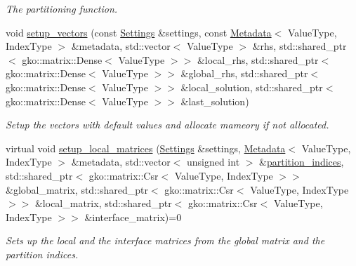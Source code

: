 \begin{DoxyCompactItemize}
\begin{DoxyCompactList}\small\item\em The partitioning function. \end{DoxyCompactList}\item 
void \hyperlink{classschwz_1_1Initialize_a3a94510247a1d4035780daf6a1d679cd}{setup\+\_\+vectors} (const \hyperlink{structschwz_1_1Settings}{Settings} \&settings, const \hyperlink{structschwz_1_1Metadata}{Metadata}$<$ Value\+Type, Index\+Type $>$ \&metadata, std\+::vector$<$ Value\+Type $>$ \&rhs, std\+::shared\+\_\+ptr$<$ gko\+::matrix\+::\+Dense$<$ Value\+Type $>$$>$ \&local\+\_\+rhs, std\+::shared\+\_\+ptr$<$ gko\+::matrix\+::\+Dense$<$ Value\+Type $>$$>$ \&global\+\_\+rhs, std\+::shared\+\_\+ptr$<$ gko\+::matrix\+::\+Dense$<$ Value\+Type $>$$>$ \&local\+\_\+solution, std\+::shared\+\_\+ptr$<$ gko\+::matrix\+::\+Dense$<$ Value\+Type $>$$>$ \&last\+\_\+solution)
\begin{DoxyCompactList}\small\item\em Setup the vectors with default values and allocate mameory if not allocated. \end{DoxyCompactList}\item 
virtual void \hyperlink{classschwz_1_1Initialize_ad24764a4ded54c2af6a5111ba8c8228f}{setup\+\_\+local\+\_\+matrices} (\hyperlink{structschwz_1_1Settings}{Settings} \&settings, \hyperlink{structschwz_1_1Metadata}{Metadata}$<$ Value\+Type, Index\+Type $>$ \&metadata, std\+::vector$<$ unsigned int $>$ \&\hyperlink{classschwz_1_1Initialize_a007426e21221298b6dca9b7c9fbd1c10}{partition\+\_\+indices}, std\+::shared\+\_\+ptr$<$ gko\+::matrix\+::\+Csr$<$ Value\+Type, Index\+Type $>$$>$ \&global\+\_\+matrix, std\+::shared\+\_\+ptr$<$ gko\+::matrix\+::\+Csr$<$ Value\+Type, Index\+Type $>$$>$ \&local\+\_\+matrix, std\+::shared\+\_\+ptr$<$ gko\+::matrix\+::\+Csr$<$ Value\+Type, Index\+Type $>$$>$ \&interface\+\_\+matrix)=0
\begin{DoxyCompactList}\small\item\em Sets up the local and the interface matrices from the global matrix and the partition indices. \end{DoxyCompactList}\end{DoxyCompactItemize}
